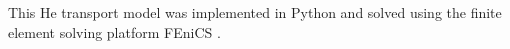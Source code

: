

This He transport model was implemented in Python and solved using the finite element solving platform FEniCS .
